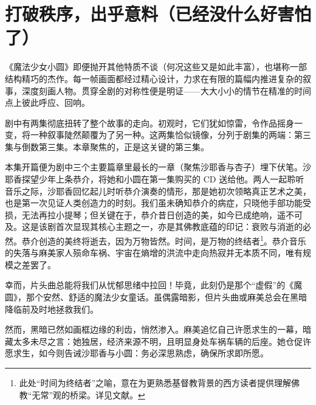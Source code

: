 \chapter[打破秩序，出乎意料（已经没什么好害怕了）]{打破秩序，出乎意料\protect\footnotemark（已经没什么好害怕了）}


《魔法少女小圆》即便抛开其他特质不谈（何况这些又是如此丰富），也堪称一部结构精巧的杰作。每一帧画面都经过精心设计，力求在有限的篇幅内推进复杂的叙事，深度刻画人物。贯穿全剧的对称性便是明证——大大小小的情节在精准的时间点上彼此呼应、回响。

剧中有两集彻底扭转了整个故事的走向。初观时，它们犹如惊雷，令作品摇身一变，将一种叙事陡然颠覆为了另一种。这两集恰似镜像，分列于剧集的两端：第三集与倒数第三集。本章聚焦的，正是这关键的第三集。

本集开篇便为剧中三个主要篇章里最长的一章（聚焦沙耶香与杏子）埋下伏笔。沙耶香探望少年上条恭介，将她和小圆在第一集购买的 CD 送给他。两人一起聆听音乐之际，沙耶香回忆起儿时听恭介演奏的情形，那是她初次领略真正艺术之美，也是第一次见证人类创造力的时刻。我们虽未确知恭介的病症，只晓他手部功能受损，无法再拉小提琴；但关键在于，恭介昔日创造的美，如今已成绝响，遥不可及。这是该剧首次显现其核心主题之一，亦是其佛教底蕴的印记：衰败与消逝的必然。恭介创造的美终将逝去，因为万物皆然。时间，是万物的终结者\footnote{此处“时间为终结者”之喻，意在为更熟悉基督教背景的西方读者提供理解佛教“无常”观的桥梁。详见文献\cite{ref25}。}。恭介音乐的失落与麻美家人殒命车祸、宇宙在熵增的洪流中走向热寂并无本质不同，唯有规模之差罢了。

幸而，片头曲总能将我们从忧郁思绪中拉回！毕竟，此刻仍是那个“虚假”的《魔圆》，那个安然、舒适的魔法少女童话。虽偶露暗影，但片头曲或麻美总会在黑暗降临前及时地拯救我们。

然而，黑暗已然如画框边缘的利齿，悄然渗入。麻美追忆自己许愿求生的一幕，暗藏太多未尽之言：她独居，经济来源不明，且明显身处车祸车辆的后座。她仓促许愿求生，如今则告诫沙耶香与小圆：务必深思熟虑，确保所求即所愿。

